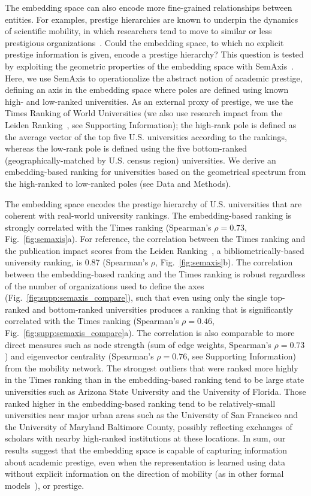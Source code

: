 \documentclass[12pt]{article} %
\def\SI{Supporting Information}
\begin{document}
The embedding space can also encode more fine-grained relationships between entities.
For examples, prestige hierarchies are known to underpin the dynamics of scientific mobility, in which researchers tend to move to similar or less prestigious organizations~\autocite{deville2014career, clauset2015hierarchy}.
Could the embedding space, to which no explicit prestige information is given, encode a prestige hierarchy?
This question is tested by exploiting the geometric properties of the embedding space with SemAxis~\autocite{an2018semaxis}.
Here, we use SemAxis to operationalize the abstract notion of academic prestige, defining an axis in the embedding space where poles are defined using known high- and low-ranked universities.
As an external proxy of prestige, we use the Times Ranking of World Universities (we also use research impact from the Leiden Ranking~\autocite{waltman2012leidenrankings}, see \SI);
the high-rank pole is defined as the average vector of the top five U.S. universities according to the rankings, whereas the low-rank pole is defined using the five bottom-ranked (geographically-matched by U.S. census region) universities.
We derive an embedding-based ranking for universities based on the geometrical spectrum from the high-ranked to low-ranked poles (see Data and Methods).

The embedding space encodes the prestige hierarchy of U.S. universities that are coherent with real-world university rankings.
The embedding-based ranking is strongly correlated with the Times ranking (Spearman's $\rho = 0.73$, Fig.~\ref{fig:semaxis}a).
For reference, the correlation between the Times ranking and the publication impact scores from the Leiden Ranking~\autocite{waltman2012leidenrankings}, a bibliometrically-based university ranking, is 0.87 (Spearman's $\rho$, Fig.~\ref{fig:semaxis}b).
The correlation between the embedding-based ranking and the Times ranking is robust regardless of the number of organizations used to define the axes (Fig.~\ref{fig:supp:semaxis_compare}), such that even using only the single top-ranked and bottom-ranked universities produces a ranking that is significantly correlated with the Times ranking (Spearman's $\rho = 0.46$, Fig.~\ref{fig:supp:semaxis_compare}a).
The correlation is also comparable to more direct measures such as node strength (sum of edge weights, Spearman's $\rho = 0.73$) and eigenvector centrality (Spearman's $\rho = 0.76$, see \SI) from the mobility network.
The strongest outliers that were ranked more highly in the Times ranking than in the embedding-based ranking tend to be large state universities such as Arizona State University and the University of Florida.
Those ranked higher in the embedding-based ranking tend to be relatively-small universities near major urban areas such as the University of San Francisco and the University of Maryland Baltimore County, possibly reflecting exchanges of scholars with nearby high-ranked institutions at these locations.
In sum, our results suggest that the embedding space is capable of capturing information about academic prestige, even when the representation is learned using data without explicit information on the direction of mobility (as in other formal models~\autocite{clauset2015hierarchy}), or prestige.
\end{document}
